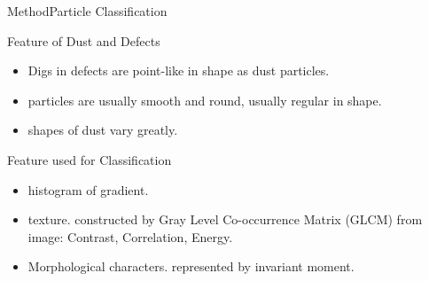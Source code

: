 \documentclass[14pt,hyperref={CJKbookmarks=true}]{beamer}
\theoremstyle{plain}
\theoremstyle{definition}
\theoremstyle{remark}
\begin{document}
\begin{frame}{Method}{Particle Classification}
\small
\begin{block}{Feature of Dust and Defects}
\begin{itemize}
\item Digs in defects are point-like in shape as dust particles.
\item particles are usually smooth and round, usually regular in shape.
\item shapes of dust vary greatly.
\end{itemize}
\end{block}

\begin{block}{Feature used for Classification}
\begin{itemize}
\item histogram of gradient.
\item texture. constructed by Gray Level Co-occurrence Matrix (GLCM) from image: Contrast, Correlation, Energy. 
\item Morphological characters. represented by invariant moment. 
\end{itemize}
\end{block}
\end{frame}
\end{document}
